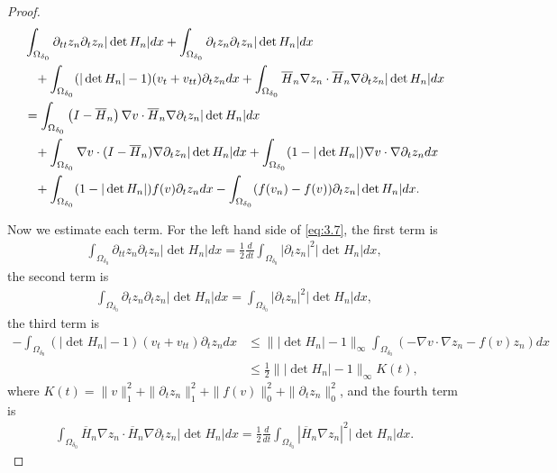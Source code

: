 \documentclass[11pt]{amsart}
\begin{document}
\begin{proof}
\begin{align}\label{eq:3.7}
    &\int_{\Omega_{\delta_0}}\partial_{tt}z_n \partial_tz_n |\det H_n| dx+\int_{\Omega_{\delta_0}}\partial_{t}z_n \partial_tz_n |\det H_n| dx\\
&\;\;\;+\int_{\Omega_{\delta_0}}(|\det H_n|-1)(v_t+v_{tt}) \partial_tz_n dx +\int_{\Omega_{\delta_0}}\overline{H}_n\nabla z_n \cdot \overline{H}_n\nabla \partial_t z_n |\det H_n| dx\notag\\
&=\int_{\Omega_{\delta_0}}\left(I-\overline{H}_n\right)\nabla v \cdot \overline{H}_n\nabla \partial_tz_n |\det H_n| dx\notag\\
&\;\;\;+\int_{\Omega_{\delta_0}}\nabla v \cdot (I-\overline{H}_n)\nabla \partial_tz_n |\det H_n|dx+\int_{\Omega_{\delta_0}}(1-|\det H_n|)\nabla v\cdot \nabla \partial_tz_ndx\notag\\
&\;\;\;+\int_{\Omega_{\delta_0}}(1-|\det H_n|)f(v) \partial_tz_ndx-\int_{\Omega_{\delta_0}} (f(v_n)-f(v)) \partial_tz_n|\det H_n| dx\notag.
\end{align}

Now we estimate each term. For the left hand side of \eqref{eq:3.7}, the first term is
\begin{align*}
    \int_{\Omega_{\delta_0}}\partial_{tt}z_n \partial_tz_n |\det H_n| dx = \frac{1}{2} \frac{d}{dt}\int_{\Omega_{\delta_0}}\left|\partial_t z_n\right|^2 |\det H_n| dx,
\end{align*}
the second term is
\begin{align*}
    \int_{\Omega_{\delta_0}}\partial_t z_n \partial_tz_n |\det H_n| dx = \int_{\Omega_{\delta_0}}\left|\partial_t z_n\right|^2 |\det H_n| dx,
\end{align*}
the third term is
\begin{align*}
    - \int_{\Omega_{\delta_0}}(|\det H_n|-1)(v_t+v_{tt}) \partial_tz_n dx
    &\leq \||\det H_n| -1\|_{\infty} \int_{\Omega_{\delta_0}}\left(- \nabla v\cdot \nabla z_n - f(v) z_n \right)dx\\
    &\leq \frac{1}{2}\||\det H_n| -1\|_{\infty} K(t),
\end{align*}
where $K(t) = \|v\|_1^2 + \|\partial_t z_n\|^2_1 +\|f(v)\|^2_0 +\|\partial_t z_n\|^2_0$, 
and the fourth term is
\begin{align*}
    \int_{\Omega_{\delta_0}}\overline{H}_n\nabla z_n \cdot \overline{H}_n\nabla \partial_t z_n |\det H_n| dx = \frac{1}{2} \frac{d}{dt}\int_{\Omega_{\delta_0}}|\overline{H}_n\nabla z_n|^2|\det H_n|dx.
\end{align*}


\end{proof}
\end{document}
